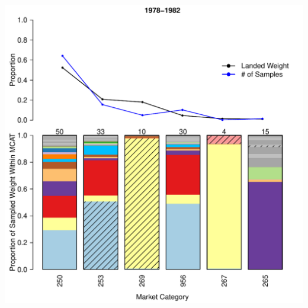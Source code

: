 \documentclass[ xcolor = pdftex, dvipsnames, table ]{beamer}
\begin{document}
\subsection{}
\begin{frame}
\centering
\includegraphics[height=\textheight]{../pictures/1978to1982Bar3.pdf}

\end{frame}
\end{document}
